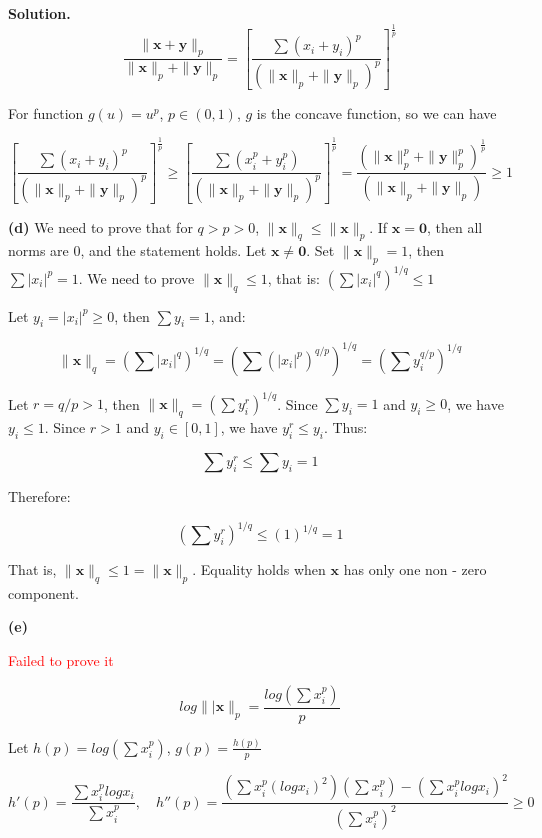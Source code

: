 \documentclass[12pt, a4paper, oneside]{ctexart}
\newenvironment{solution}{\par\noindent\textbf{Solution. }}{\par}
\begin{document}
\begin{solution}
$$
\frac{\| \mathbf{x}+\mathbf{y}\|_p}{\|\mathbf{x}\|_p +\| \mathbf{y}\|_p}=[\frac{\sum (x_i+y_i)^p}{(\| \mathbf{x}\|_p +\| \mathbf{y}\|_p)^p}]^{\frac{1}{p}}
$$

For function $g(u)=u^p$, $p\in (0,1)$, $g$ is the concave function, so we can have

$$
[\frac{\sum (x_i+y_i)^p}{(\| \mathbf{x}\|_p +\| \mathbf{y}\|_p)^p}]^{\frac{1}{p}} \geq [\frac{\sum (x_i^p+y_i^p)}{(\| \mathbf{x}\|_p +\| \mathbf{y}\|_p)^p}]^{\frac{1}{p}} = \frac{(\| \mathbf{x}\|_p^p +\| \mathbf{y}\|_p^p)^{\frac{1}{p}}}{(\| \mathbf{x}\|_p +\| \mathbf{y}\|_p)} \geq 1
$$

\vspace{12pt}

\textbf{(d)}
We need to prove that for $ q > p > 0 $, $ \|\mathbf{x}\|_q \leq \|\mathbf{x}\|_p $. If $ \mathbf{x} = \mathbf{0} $, then all norms are 0, and the statement holds. Let $ \mathbf{x} \neq \mathbf{0} $. Set $ \|\mathbf{x}\|_p = 1 $, then $ \sum |x_i|^p = 1 $. We need to prove $ \|\mathbf{x}\|_q \leq 1 $, that is: $\left( \sum |x_i|^q \right)^{1/q} \leq 1$

Let $ y_i = |x_i|^p \geq 0 $, then $ \sum y_i = 1 $, and:

$$
\|\mathbf{x}\|_q = \left( \sum |x_i|^q \right)^{1/q} = \left( \sum (|x_i|^p)^{q/p} \right)^{1/q} = \left( \sum y_i^{q/p} \right)^{1/q}
$$

Let $ r = q/p > 1 $, then $ \|\mathbf{x}\|_q = \left( \sum y_i^r \right)^{1/q} $. Since $ \sum y_i = 1 $ and $ y_i \geq 0 $, we have $ y_i \leq 1 $. Since $ r > 1 $ and $ y_i \in [0, 1] $, we have $ y_i^r \leq y_i $. Thus:

$$
\sum y_i^r \leq \sum y_i = 1
$$

Therefore:

$$
\left( \sum y_i^r \right)^{1/q} \leq (1)^{1/q} = 1
$$

That is, $ \|\mathbf{x}\|_q \leq 1 = \|\mathbf{x}\|_p $. Equality holds when $ \mathbf{x} $ has only one non - zero component.

\vspace{12pt}

\textbf{(e)} 

\textcolor{red}{Failed to prove it}

$$
log\||\mathbf{x}\|_p=\frac{log(\sum x_i^p)}{p}
$$

Let $h(p)= log(\sum x_i^p) $, $g(p)=\frac{h(p)}{p}$

$$
h'(p)=\frac{\sum x_i^plogx_i}{\sum x_i^p}, \quad h''(p)= \frac{(\sum x_i^p(logx_i)^2)(\sum x_i^p)-(\sum x_i^plogx_i)^2}{(\sum x_i^p)^2} \geq 0
$$


\end{solution}
\end{document}
